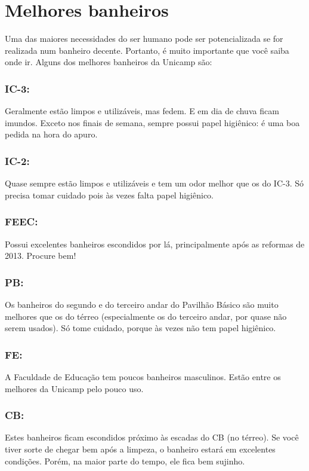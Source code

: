 
\section{Melhores banheiros}

Uma das maiores necessidades do ser humano pode ser potencializada se for
realizada num banheiro decente. Portanto, é muito importante que você saiba
onde ir. Alguns dos melhores banheiros da Unicamp são:

\subsubsection{IC-3:} Geralmente estão limpos e utilizáveis, mas fedem. E em
dia de chuva ficam imundos. Exceto nos finais de semana, sempre possui papel
higiênico: é uma boa pedida na hora do apuro.

\subsubsection{IC-2:} Quase sempre estão limpos e utilizáveis e tem um odor
melhor que os do IC-3. Só precisa tomar cuidado pois às vezes falta papel
higiênico.

\subsubsection{FEEC:} Possui excelentes banheiros escondidos por lá,
principalmente após as reformas de 2013. Procure bem!

\subsubsection{PB:} Os banheiros do segundo e do terceiro andar do Pavilhão
Básico são muito melhores que os do térreo (especialmente os do terceiro andar,
por quase não serem usados). Só tome cuidado, porque às vezes não tem papel
higiênico.

\subsubsection{FE:} A Faculdade de Educação tem poucos banheiros masculinos.
Estão entre os melhores da Unicamp pelo pouco uso.

\subsubsection{CB:} Estes banheiros ficam escondidos próximo às escadas do CB
(no térreo). Se você tiver sorte de chegar bem após a limpeza, o banheiro
estará em excelentes condições. Porém, na maior parte do tempo, ele fica bem
sujinho.

